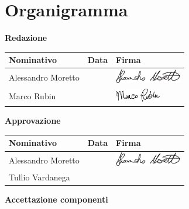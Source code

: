 \section{Organigramma}
	
\textbf{Redazione}
\begin{center}
	\begin{tabu} to \textwidth {|X[4]|X[2c]|X[5]|}
	\hline
     Nominativo & Data & Firma \\ \hline
     Alessandro Moretto & & \includegraphics[height=6mm]{Commons/Pics/Signatures/Moretto.pdf}\\ \hline
     Marco Rubin & &\includegraphics[height=6mm]{Commons/Pics/Signatures/Rubin.pdf} \\ \hline
     \end{tabu}
	\end{center}
\textbf{Approvazione}
	\begin{center}
	\begin{tabu} to \textwidth {|X[4]|X[2c]|X[5]|}
	\hline
     Nominativo & Data & Firma \\ \hline
     Alessandro Moretto & & \includegraphics[height=6mm]{Commons/Pics/Signatures/Moretto.pdf}\\ \hline
     Tullio Vardanega & & \parbox[b]{1cm}{\vspace{6mm}}\\ \hline
     \end{tabu}
	\end{center}
\textbf{Accettazione componenti}
